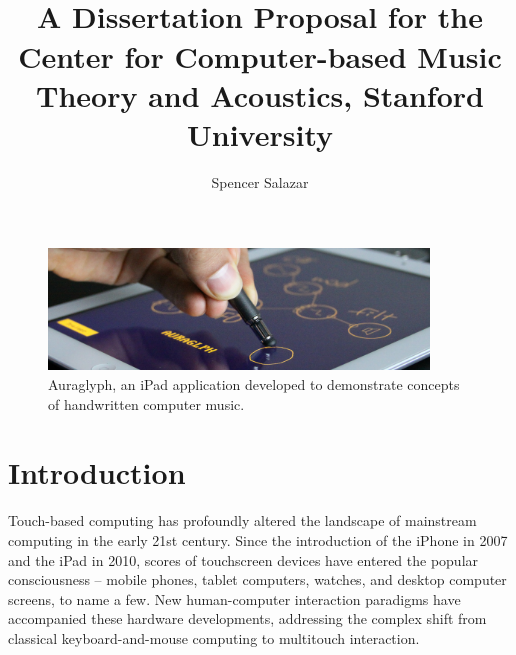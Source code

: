 \documentclass[10pt,letterpaper]{article}
\begin{document}

\title{ \\ \vspace{2 mm}
\normalfont\large A Dissertation Proposal for the Center for Computer-based Music Theory and Acoustics, Stanford University}

\author{Spencer Salazar}

\maketitle

\begin{figure}[h!]
	\centering
	\includegraphics[width=0.9\textwidth]{figures/auraglyphHand2.jpg}
	\caption{Auraglyph, an iPad application developed to demonstrate concepts of handwritten computer music.}
	\label{fig:auraglyphInUse}
\end{figure}

\section{Introduction}
\label{sec:Introduction}

Touch-based computing has profoundly altered the landscape of mainstream computing in the early 21st century. 
Since the introduction of the iPhone in 2007 and the iPad in 2010, scores of touchscreen devices have entered the popular consciousness -- mobile phones, tablet computers, watches, and desktop computer screens, to name a few. 
New human-computer interaction paradigms have accompanied these hardware developments, addressing the complex shift from classical keyboard-and-mouse computing to multitouch interaction. 
\end{document}
